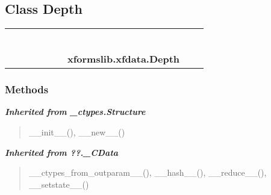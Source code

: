 
\subsection{Class Depth}

    \label{xformslib:xfdata:Depth}
\begin{tabular}{cccccccccc}
\multicolumn{2}{r}{\settowidth{\BCL}{object}\multirow{2}{\BCL}{object}}
&&
&&
&&
  \\\cline{3-3}
  &&\multicolumn{1}{c|}{}
&&
&&
&&
  \\
\multicolumn{4}{r}{\settowidth{\BCL}{??.\_CData}\multirow{2}{\BCL}{??.\_CData}}
&&
&&
  \\\cline{5-5}
  &&&&\multicolumn{1}{c|}{}
&&
&&
  \\
\multicolumn{6}{r}{\settowidth{\BCL}{\_ctypes.Structure}\multirow{2}{\BCL}{\_ctypes.Structure}}
&&
  \\\cline{7-7}
  &&&&&&\multicolumn{1}{c|}{}
&&
  \\
&&&&&&\multicolumn{2}{l}{\textbf{xformslib.xfdata.Depth}}
\end{tabular}



  \subsubsection{Methods}


\large{\textbf{\textit{Inherited from \_ctypes.Structure}}}

\begin{quote}
\_\_init\_\_(), \_\_new\_\_()
\end{quote}

\large{\textbf{\textit{Inherited from ??.\_CData}}}

\begin{quote}
\_\_ctypes\_from\_outparam\_\_(), \_\_hash\_\_(), \_\_reduce\_\_(), \_\_setstate\_\_()
\end{quote}

